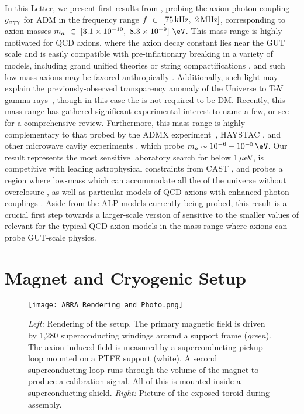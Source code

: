 \documentclass[aps,prl,amsmath,amssymb,reprint,superscriptaddress, nofootinbib,
]{revtex4-1}
\begin{document}
In this Letter, we present first results from \abra, probing the axion-photon coupling $g_{a\gamma\gamma}$ for ADM in the frequency range $f~\in~[75\,\rm{kHz}, \ 2\,{\rm MHz}]$, corresponding to axion masses $m_a~\in~[3.1 \times 10^{-10}, \ 8.3 \times 10^{-9}]\ \eV$. This mass range is highly motivated for QCD axions, where the axion decay constant lies near the GUT scale and is easily compatible with pre-inflationary \PQ breaking in a variety of models, including grand unified theories \cite{DiLuzio:2018gqe} or string compactifications \cite{Svrcek:2006yi,Arvanitaki:2009fg}, and such low-mass axions may be favored anthropically \cite{Tegmark:2005dy}. Additionally, such light \ALPs may explain the previously-observed transparency anomaly of the Universe to TeV gamma-rays~\cite{Horns:2012fx,Meyer:2013pny,Roncadelli2008,Burrage2009}, though in this case the \ALP is not required to be DM. Recently, this mass range has gathered significant experimental interest \cite{Sikivie:2013laa,ABRA2016,Silva-Feaver2016,PhysRevX.4.021030,Gatti:2018ojx,DeRocco:2018jwe,Liu:2018icu} to name a few, or see~\cite{Irastorza:2018} for a comprehensive review. Furthermore, this mass range is highly complementary to that probed by the ADMX experiment~\cite{Asztalos2001,Asztalos2009,ADMX2018}, HAYSTAC \cite{HAYSTAC2018a}, and other microwave cavity experiments \cite{PhysRevD.42.1297,PhysRevLett.59.839,PhysRevLett.80.2043}, which probe $m_a \sim 10^{-6}-10^{-5}\,\eV$. Our result represents the most sensitive laboratory search for \ADM below 1\,$\mu$eV, is competitive with leading astrophysical constraints from CAST \cite{CAST2017},  and probes a region where low-mass \ALPs which can accommodate all the \DM of the universe without overclosure \cite{Davoudiasl:2015vba,Graham:2018jyp,Agrawal:2017eqm,2010PhRvD..81f3508V,Co:2016vsi}, as well as particular models of QCD axions with enhanced photon couplings \cite{Agrawal:2017cmd,Farina:2016tgd}. Aside from the ALP models currently being probed, this result is a crucial first step towards a larger-scale version of \ABRA sensitive to the smaller values of \gagg relevant for the typical QCD axion models in the mass range where axions can probe GUT-scale physics.



 

\section{Magnet and Cryogenic Setup}
\begin{figure}[h!]
  \centering
  \texttt{[image: ABRA\_Rendering\_and\_Photo.png]}
  \caption{\emph{Left:} Rendering of the \abra setup. The primary magnetic field is driven by 1,280 superconducting windings around a \POM support frame (\emph{green}). The axion-induced field is measured by a superconducting pickup loop mounted on a PTFE support (white). A second superconducting loop runs through the volume of the magnet to produce a calibration signal. All of this is mounted inside a superconducting shield. \emph{Right:} Picture of the exposed toroid during assembly.}
    \label{fig:ABRAPhoto}
\end{figure}
\end{document}
